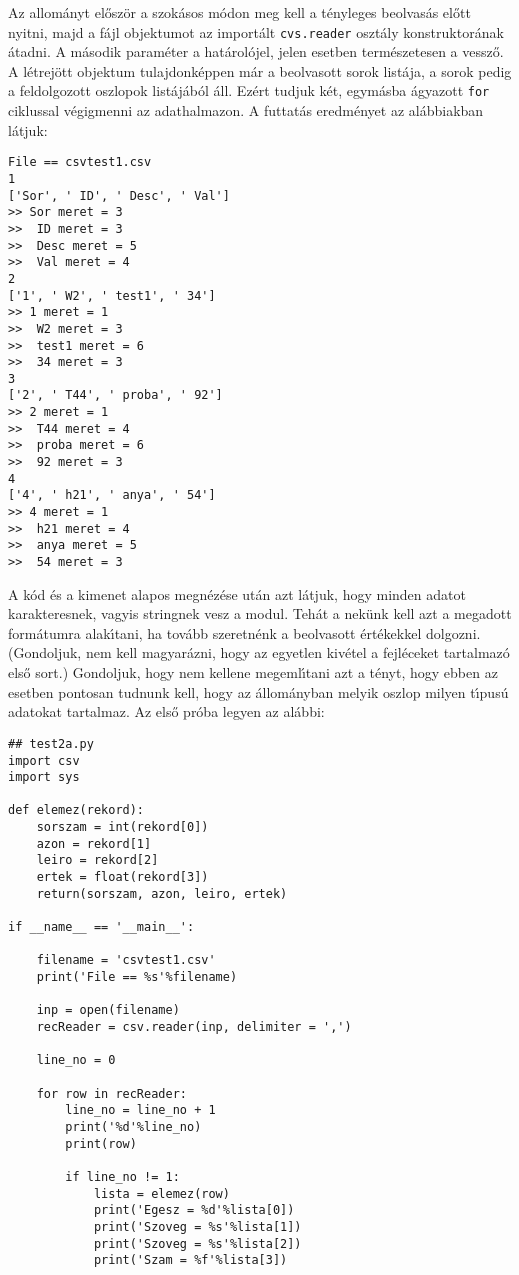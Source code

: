 \noindent Az allom\'anyt el\H{o}sz\"or a szok\'asos m\'odon meg kell a t\'enyleges beolvas\'as el\H{o}tt 
nyitni, majd a f\'ajl objektumot az import\'alt {\tt cvs.reader} oszt\'aly konstruktor\'anak \'atadni. A 
m\'asodik param\'eter a hat\'arol\'ojel, jelen esetben term\'eszetesen a vessz\H{o}. A l\'etrej\"ott 
objektum tulajdonk\'eppen m\'ar a beolvasott sorok list\'aja, a sorok pedig a feldolgozott oszlopok 
list\'aj\'ab\'ol \'all. Ez\'ert tudjuk k\'et, egym\'asba \'agyazott {\tt for} ciklussal v\'egigmenni 
az adathalmazon. A futtat\'as eredm\'enyet az al\'abbiakban l\'atjuk:

\begin{Verbatim}[fontsize=\small]
File == csvtest1.csv
1
['Sor', ' ID', ' Desc', ' Val']
>> Sor meret = 3
>>  ID meret = 3
>>  Desc meret = 5
>>  Val meret = 4
2
['1', ' W2', ' test1', ' 34']
>> 1 meret = 1
>>  W2 meret = 3
>>  test1 meret = 6
>>  34 meret = 3
3
['2', ' T44', ' proba', ' 92']
>> 2 meret = 1
>>  T44 meret = 4
>>  proba meret = 6
>>  92 meret = 3
4
['4', ' h21', ' anya', ' 54']
>> 4 meret = 1
>>  h21 meret = 4
>>  anya meret = 5
>>  54 meret = 3
\end{Verbatim}

\noindent A k\'od \'es a kimenet alapos megn\'ez\'ese ut\'an azt l\'atjuk, hogy minden adatot 
karakteresnek, vagyis stringnek vesz a modul. Teh\'at a nek\"unk kell azt a megadott form\'atumra 
alak\'{\i}tani, ha tov\'abb szeretn\'enk a beolvasott \'ert\'ekekkel dolgozni. (Gondoljuk, nem 
kell magyar\'azni, hogy az egyetlen kiv\'etel a fejl\'eceket tartalmaz\'o els\H{o} sort.) 
Gondoljuk, hogy nem kellene megeml\'{\i}tani azt a t\'enyt, hogy ebben az esetben pontosan tudnunk 
kell, hogy az \'allom\'anyban melyik oszlop milyen t\'{\i}pus\'u adatokat tartalmaz. Az els\H{o} 
pr\'oba legyen az al\'abbi:

\begin{Verbatim}[fontsize=\small]
## test2a.py
import csv
import sys

def elemez(rekord):
    sorszam = int(rekord[0])
    azon = rekord[1]
    leiro = rekord[2]
    ertek = float(rekord[3])
    return(sorszam, azon, leiro, ertek)

if __name__ == '__main__':

    filename = 'csvtest1.csv'
    print('File == %s'%filename)

    inp = open(filename)
    recReader = csv.reader(inp, delimiter = ',')

    line_no = 0

    for row in recReader:
        line_no = line_no + 1 
        print('%d'%line_no)
        print(row)

        if line_no != 1:
            lista = elemez(row)
            print('Egesz = %d'%lista[0])
            print('Szoveg = %s'%lista[1])
            print('Szoveg = %s'%lista[2])
            print('Szam = %f'%lista[3])
\end{Verbatim}

